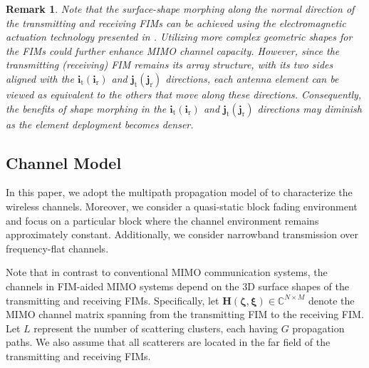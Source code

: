 \documentclass[lettersize,journal]{IEEEtran}
\newtheorem{remark}{\textbf{Remark}}
\begin{document}
\begin{remark}
Note that the surface-shape morphing along the normal direction of the transmitting and receiving FIMs can be achieved using the electromagnetic actuation technology presented in \cite{Nature_2022_Bai_A}. Utilizing more complex geometric shapes for the FIMs could further enhance MIMO channel capacity. However, since the transmitting (receiving) FIM remains its array structure, with its two sides aligned with the $\mathbf{i}_{\textrm{t}} \left ( \mathbf{i}_{\textrm{r}}\right )$ and $\mathbf{j}_{\textrm{t}} \left ( \mathbf{j}_{\textrm{r}}\right )$ directions, each antenna element can be viewed as equivalent to the others that move along these directions. Consequently, the benefits of shape morphing in the $\mathbf{i}_{\textrm{t}} \left ( \mathbf{i}_{\textrm{r}}\right )$ and $\mathbf{j}_{\textrm{t}} \left ( \mathbf{j}_{\textrm{r}}\right )$ directions may diminish as the element deployment becomes denser.
\end{remark}


\subsection{Channel Model}
In this paper, we adopt the multipath propagation model of \cite{JSTSP_2016_Heath_An} to characterize the wireless channels. Moreover, we consider a quasi-static block fading environment and focus on a particular block where the channel environment remains approximately constant. Additionally, we consider narrowband transmission over frequency-flat channels.

Note that in contrast to conventional MIMO communication systems, the channels in FIM-aided MIMO systems depend on the 3D surface shapes of the transmitting and receiving FIMs. Specifically, let $\mathbf{H}\left ( \boldsymbol{\zeta}, \boldsymbol{\xi} \right ) \in \mathbb{C}^{N \times M}$ denote the MIMO channel matrix spanning from the transmitting FIM to the receiving FIM. Let $L$ represent the number of scattering clusters, each having $G$ propagation paths. We also assume that all scatterers are located in the far field of the transmitting and receiving FIMs.
\end{document}
